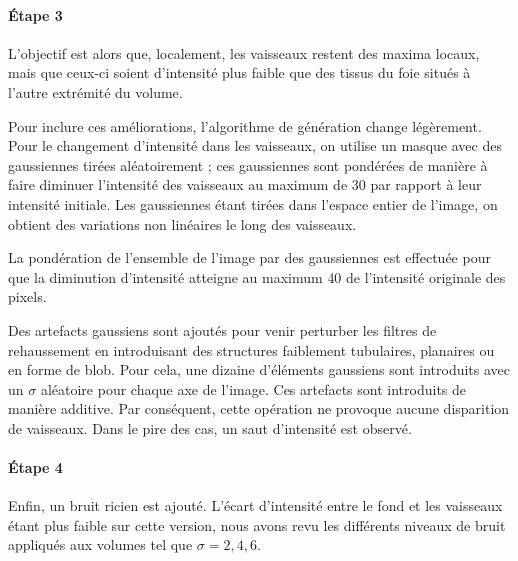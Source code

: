 \paragraph{Étape 3}

 L'objectif est alors que, localement, les vaisseaux restent des maxima locaux, mais que ceux-ci soient d'intensité plus faible que des tissus du foie situés à l'autre extrémité du volume.

Pour inclure ces améliorations, l'algorithme de génération change légèrement. Pour le changement d'intensité dans les vaisseaux, on utilise un masque avec des gaussiennes tirées aléatoirement ; ces gaussiennes sont pondérées de manière à faire diminuer l'intensité des vaisseaux au maximum de $30$ \percent{} par rapport à leur intensité initiale. Les gaussiennes étant tirées dans l'espace entier de l'image, on obtient des variations non linéaires le long des vaisseaux.

La pondération de l'ensemble de l'image par des gaussiennes est effectuée pour que la diminution d'intensité atteigne au maximum $40$ \percent{} de l'intensité originale des pixels.

Des artefacts gaussiens sont ajoutés pour venir perturber les filtres de rehaussement en introduisant des structures faiblement tubulaires, planaires ou en forme de blob. Pour cela, une dizaine d'éléments gaussiens sont introduits avec un $\sigma$ aléatoire pour chaque axe de l'image. Ces artefacts sont introduits de manière additive. Par conséquent, cette opération ne provoque aucune disparition de vaisseaux. Dans le pire des cas, un saut d'intensité est observé.

\paragraph{Étape 4}
Enfin, un bruit ricien est ajouté. L'écart d'intensité entre le fond et les vaisseaux étant plus faible sur cette version, nous avons revu les différents niveaux de bruit appliqués aux volumes tel que $\sigma={2,4,6}$.

